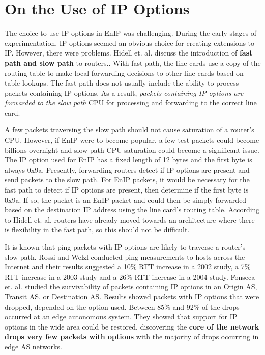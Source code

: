 \section{On the Use of IP Options}
The choice to use IP options in EnIP was challenging.  During
the early stages of experimentation, IP options seemed an obvious 
choice for creating extensions to IP. However,
there were problems.  Hidell et. al. discuss the introduction
of \textbf{fast path and slow path} to routers.\cite{router02}.
With fast path, the line cards use a copy of the routing table to
make local forwarding decisions to other line cards based on table
lookups.  The fast path does not usually include the ability to
process packets containing IP options\cite{router01}.  As a result,
\textit{packets containing IP options are forwarded to the slow path}
CPU for processing and forwarding to the correct line card.

A few packets traversing the slow path should not cause saturation
of a router's CPU.  However, if EnIP were to become popular, a 
few test packets could become billions overnight and slow path CPU 
saturation could become a significant issue.  
The IP option used for EnIP has a fixed length of
12 bytes and the first byte is always 0x9a.  Presently, forwarding 
routers detect if IP options are present and send packets to the slow
path.  For EnIP packets, it would be necessary for the fast path to detect if IP
options are present, then determine if the first byte is 0x9a.  If so,
the packet is an EnIP packet and could then be simply forwarded based on 
the destination IP address using the line card's routing table.
According to Hidell et. al. routers have already moved
towards an architecture where there is flexibility in the fast path,
so this should not be difficult. 

It is known that ping packets with IP options are likely to traverse a router's slow
path. Rossi and Welzl conducted ping measurements to hosts
across the Internet and their results suggested a 10\% RTT increase
in a 2002 study, a 7\% RTT increase in a 2003 study\cite{ipopts02}
and a 26\% RTT increase in a 2004 study\cite{ipopts03}.
Fonseca et. al. studied the survivability of packets
containing IP options in an Origin AS, Transit AS, or Destination
AS\cite{ipopts01}.  Results showed packets with IP options that were
dropped, depended on the option used.
Between 85\% and 92\% of the drops occurred at an edge autonomous
system.  They showed that support for IP options in the wide area
could be restored, discovering the \textbf{core of the network
drops very few packets with options} with the majority of 
drops occurring in edge AS networks.

